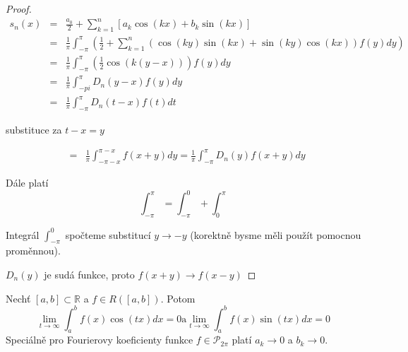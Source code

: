 \begin{proof}
\begin{eqnarray}
s_n(x) & = & \frac{a_0}{2} + \sum_{k=1}^{n} \left[ a_k \cos(kx) + b_k \sin(kx) \right] \nonumber\\
& = & \frac{1}{\pi} \int_{-\pi}^\pi \left( \frac{1}{2} + \sum_{k=1}^n \left( \cos(ky) \sin(kx) + \sin(ky) \cos (kx) \right) f(y) dy \right) \nonumber\\
& = & \frac{1}{\pi} \int_{-\pi}^\pi \left( \frac{1}{2} \cos(k(y-x))  \right) f(y) dy \nonumber\\
& = & \frac{1}{\pi} \int_{-pi}^\pi D_n(y-x) f(y) dy \nonumber\\
& = & \frac{1}{\pi} \int_{-\pi}^\pi D_n(t-x) f(t) dt \nonumber
\end{eqnarray}

substituce za $t-x=y$

\begin{eqnarray}
& = & \frac{1}{\pi} \int_{-\pi -x}^{\pi-x} f(x+y) dy = \frac{1}{\pi} \int_{-\pi}^\pi D_n(y) f(x+y) dy \nonumber
\end{eqnarray}

Dále platí 
$$\int_{-\pi}^\pi = \int_{-\pi}^0 + \int_{0}^\pi$$

Integrál $\int_{-\pi}^0$ spočteme substitucí $y \rightarrow -y$ (korektně bysme měli použít pomocnou proměnnou).

$D_n(y)$ je sudá funkce, proto $f(x+y) \rightarrow f(x-y)$
\end{proof}

\begin{vetat}
\label{Riemann-Lebesqueovo lemma}
Nechť $[a,b] \subset \mathbb{R}$ a $f \in R([a,b])$. Potom
$$\lim_{t \rightarrow \infty} \int_a^b f(x) \cos(tx) dx = 0 \mathrm{a} \lim_{t \rightarrow \infty} \int_a^b f(x) \sin(tx) dx = 0$$
Speciálně pro Fourierovy koeficienty funkce $f \in \mathcal{P}_{2 \pi}$ platí $a_k \rightarrow 0$ a $b_k \rightarrow 0$.
\end{vetat}


